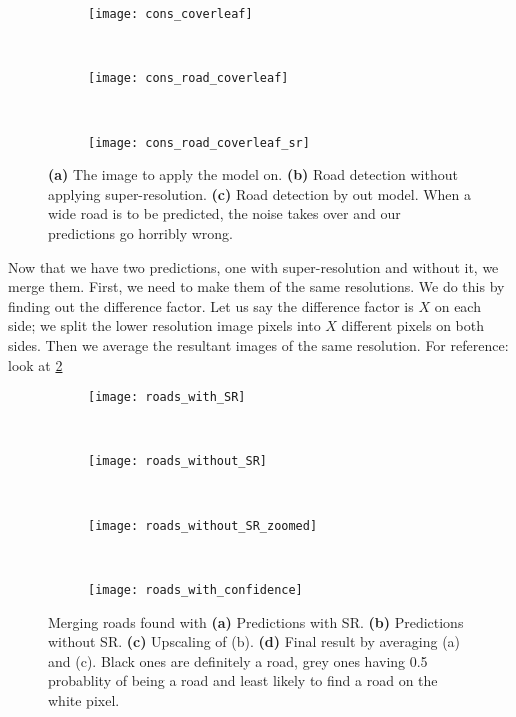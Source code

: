 \begin{figure}[h!]
  \centering
  \begin{subfigure}{0.3\textwidth}
    \texttt{[image: cons\_coverleaf]}
    \caption{}
  \end{subfigure}~
  \begin{subfigure}{0.3\textwidth}
    \texttt{[image: cons\_road\_coverleaf]}
    \caption{}
  \end{subfigure}~
  \begin{subfigure}{0.3\textwidth}
    \texttt{[image: cons\_road\_coverleaf\_sr]}
    \caption{}
  \end{subfigure}
  \caption[Problem in predictions large roads]{\textbf{(a)} The image to apply the model on. \textbf{(b)} Road detection without applying super-resolution. \textbf{(c)} Road detection by out model. When a wide road is to be predicted, the noise takes over and our predictions go horribly wrong.}
  \label{fig:cons_coverleaf}
\end{figure}


Now that we have two predictions, one with super-resolution and without it, we merge them. First, we need to make them of the same resolutions. We do this by finding out the difference factor. Let us say the difference factor is $X$ on each side; we split the lower resolution image pixels into $X$ different pixels on both sides. Then we average the resultant images of the same resolution. For reference: look at \cref{fig:roads_in_confidence}

\begin{figure}[h!]
  \begin{subfigure}[b]{0.25\textwidth}
    \texttt{[image: roads\_with\_SR]}
    \caption{}
  \end{subfigure}~
  \begin{subfigure}[b]{0.15\textwidth}
    \texttt{[image: roads\_without\_SR]}
    \caption{}
  \end{subfigure}~
  \begin{subfigure}[b]{0.25\textwidth}
    \texttt{[image: roads\_without\_SR\_zoomed]}
    \caption{}
  \end{subfigure}~
  \begin{subfigure}[b]{0.25\textwidth}
    \texttt{[image: roads\_with\_confidence]}
    \caption{}
  \end{subfigure}
  \caption[Finding likelihood of roads in predictions]{Merging roads found with \textbf{(a)} Predictions with SR. \textbf{(b)} Predictions without SR. \textbf{(c)} Upscaling of (b). \textbf{(d)} Final result by averaging (a) and (c). Black ones are definitely a road, grey ones having 0.5 probablity of being a road and least likely to find a road on the white pixel.}
  \label{fig:roads_in_confidence}
\end{figure}

